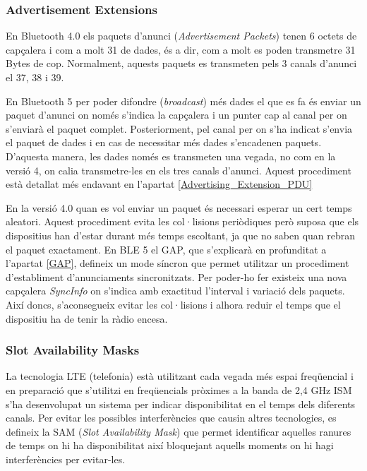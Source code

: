 \subsubsection{Advertisement Extensions}
\label{Advertisement_Extensions}
En Bluetooth 4.0 els paquets d'anunci (\textit{Advertisement Packets}) tenen 6 octets de capçalera i com a molt 31 de dades, és a dir, com a molt es poden transmetre 31 Bytes de cop.
Normalment, aquests paquets es transmeten pels 3 canals d'anunci el 37, 38 i 39.

En Bluetooth 5 per poder difondre (\textit{broadcast}) més dades el que es fa és enviar un paquet d'anunci on només s'indica la capçalera i un punter cap al canal per on s'enviarà el paquet complet.
Posteriorment, pel canal per on s'ha indicat s'envia el paquet de dades i en cas de necessitar més dades s'encadenen paquets.
D'aquesta manera, les dades només es transmeten una vegada, no com en la versió 4, on calia transmetre-les en els tres canals d'anunci.
Aquest procediment està detallat més endavant en l'apartat  \ref{Advertising_Extension_PDU}

En la versió 4.0 quan es vol enviar un paquet és necessari esperar un cert temps aleatori.
Aquest procediment evita les col·lisions periòdiques però suposa que els dispositius han d'estar durant més temps escoltant, ja que no saben quan rebran el paquet exactament.
En BLE 5 el GAP, que s'explicarà en profunditat a l'apartat \ref{GAP}, defineix un mode síncron que permet utilitzar un procediment d'establiment d'anunciaments sincronitzats.
Per poder-ho fer existeix una nova capçalera \textit{SyncInfo} on s'indica amb exactitud l'interval i variació dels paquets.
Així doncs, s'aconsegueix evitar les col·lisions i alhora reduir el temps que el dispositiu ha de tenir la ràdio encesa.

\subsubsection{Slot Availability Masks}
La tecnologia LTE (telefonia) està utilitzant cada vegada més espai freqüencial i en preparació que s'utilitzi en freqüencials pròximes a la banda de 2,4 GHz ISM s'ha desenvolupat un sistema per indicar disponibilitat en el temps dels diferents canals.
Per evitar les possibles interferències que causin altres tecnologies, es defineix la SAM (\textit{Slot Availability Mask}) que permet identificar aquelles ranures de temps on hi ha disponibilitat així bloquejant aquells moments on hi hagi interferències per evitar-les.

